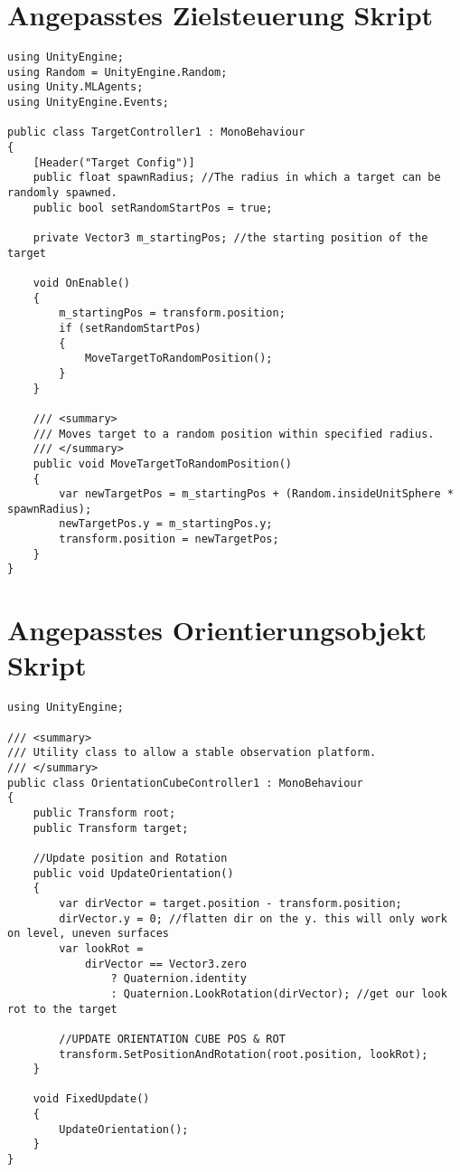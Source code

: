 \section{Angepasstes Zielsteuerung Skript}
\begin{lstlisting}[caption={Zielsteuerung Skript},captionpos=b,label={lst:skript_zielsteuerung}]
using UnityEngine;
using Random = UnityEngine.Random;
using Unity.MLAgents;
using UnityEngine.Events;

public class TargetController1 : MonoBehaviour
{
    [Header("Target Config")]
    public float spawnRadius; //The radius in which a target can be randomly spawned.
    public bool setRandomStartPos = true;

    private Vector3 m_startingPos; //the starting position of the target

    void OnEnable()
    {
        m_startingPos = transform.position;
        if (setRandomStartPos)
        {
            MoveTargetToRandomPosition();
        }
    }

    /// <summary>
    /// Moves target to a random position within specified radius.
    /// </summary>
    public void MoveTargetToRandomPosition()
    {
        var newTargetPos = m_startingPos + (Random.insideUnitSphere * spawnRadius);
        newTargetPos.y = m_startingPos.y;
        transform.position = newTargetPos;
    }
}
\end{lstlisting}

\section{Angepasstes Orientierungsobjekt Skript}
\begin{lstlisting}[caption={Orientationsobjekt Skript},captionpos=b,label={lst:skript_orientationsobjekt}]
using UnityEngine;

/// <summary>
/// Utility class to allow a stable observation platform.
/// </summary>
public class OrientationCubeController1 : MonoBehaviour
{
    public Transform root;
    public Transform target;

    //Update position and Rotation
    public void UpdateOrientation()
    {
        var dirVector = target.position - transform.position;
        dirVector.y = 0; //flatten dir on the y. this will only work on level, uneven surfaces
        var lookRot =
            dirVector == Vector3.zero
                ? Quaternion.identity
                : Quaternion.LookRotation(dirVector); //get our look rot to the target

        //UPDATE ORIENTATION CUBE POS & ROT
        transform.SetPositionAndRotation(root.position, lookRot);
    }

    void FixedUpdate()
    {
        UpdateOrientation();
    }
}
\end{lstlisting}

